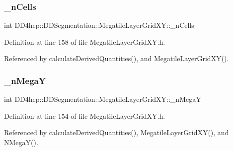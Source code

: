 \subsubsection{\texorpdfstring{\+\_\+n\+Cells}{\_nCells}}
{\footnotesize\ttfamily int D\+D4hep\+::\+D\+D\+Segmentation\+::\+Megatile\+Layer\+Grid\+X\+Y\+::\+\_\+n\+Cells\hspace{0.3cm}{\ttfamily [protected]}}



Definition at line 158 of file Megatile\+Layer\+Grid\+X\+Y.\+h.



Referenced by calculate\+Derived\+Quantities(), and Megatile\+Layer\+Grid\+X\+Y().

\hypertarget{class_d_d4hep_1_1_d_d_segmentation_1_1_megatile_layer_grid_x_y_afbd476c007a88c207aa09e12b43c8be7}{}\label{class_d_d4hep_1_1_d_d_segmentation_1_1_megatile_layer_grid_x_y_afbd476c007a88c207aa09e12b43c8be7} 
\subsubsection{\texorpdfstring{\+\_\+n\+MegaY}{\_nMegaY}}
{\footnotesize\ttfamily int D\+D4hep\+::\+D\+D\+Segmentation\+::\+Megatile\+Layer\+Grid\+X\+Y\+::\+\_\+n\+MegaY\hspace{0.3cm}{\ttfamily [protected]}}



Definition at line 154 of file Megatile\+Layer\+Grid\+X\+Y.\+h.



Referenced by calculate\+Derived\+Quantities(), Megatile\+Layer\+Grid\+X\+Y(), and N\+Mega\+Y().

\hypertarget{class_d_d4hep_1_1_d_d_segmentation_1_1_megatile_layer_grid_x_y_a34d0954062dab57ef3ce16b3fc5021fe}{}\label{class_d_d4hep_1_1_d_d_segmentation_1_1_megatile_layer_grid_x_y_a34d0954062dab57ef3ce16b3fc5021fe} 
